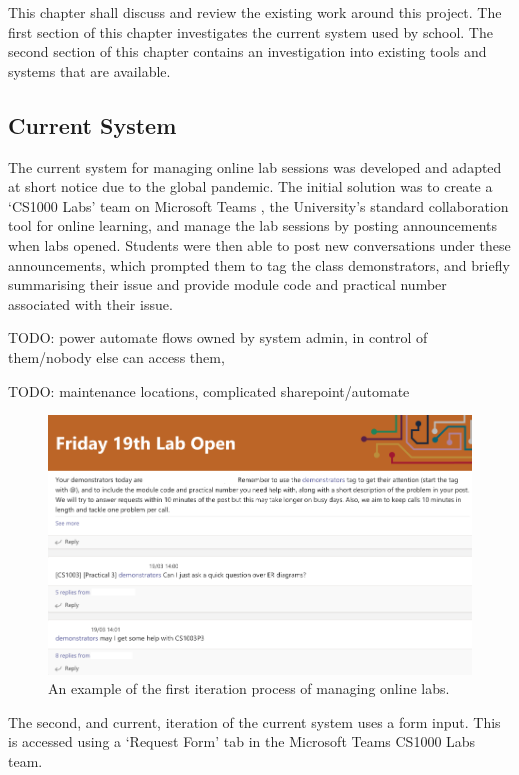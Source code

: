 \documentclass[a4paper,11pt]{article}
\begin{document}
This chapter shall discuss and review the existing work around this project. The first section of this chapter investigates the current system used by school. The second section of this chapter contains an investigation into existing tools and systems that are available.

\subsection{Current System}

The current system for managing online lab sessions was developed and adapted at short notice due to the global pandemic. The initial solution was to create a `CS1000 Labs' team on Microsoft Teams \cite{teams}, the University's standard collaboration tool for online learning, and manage the lab sessions by posting announcements when labs opened. Students were then able to post new conversations under these announcements, which prompted them to tag the class demonstrators, and briefly summarising their issue and provide module code and practical number associated with their issue.

TODO: power automate flows owned by system admin, in control of them/nobody else can access them,

TODO: maintenance locations, complicated sharepoint/automate

\FloatBarrier
\begin{figure}[H]
  \centering
  \includegraphics[width=\textwidth]{teams1.png}
  \caption{An example of the first iteration process of managing online labs.}
\end{figure}

The second, and current, iteration of the current system uses a form input. This is accessed using a `Request Form' tab in the Microsoft Teams \cite{teams} CS1000 Labs team. 
\end{document}

